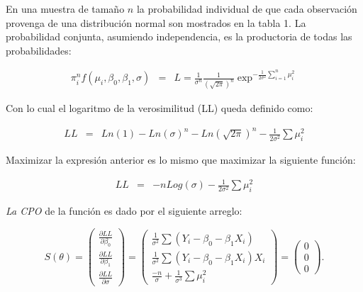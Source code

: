 \begin{frame}
	En una muestra de tamaño $n$ la probabilidad individual de que
	cada observación provenga de una distribución normal son mostrados
	en la tabla 1. La probabilidad conjunta, asumiendo independencia,
	es la productoria de todas las probabilidades:
	
	\begin{eqnarray}
		\pi_i^n f(\mu_i,\beta_0,\beta_1,\sigma) &=&L=
		\frac{1}{\sigma^n}\frac{1}{(\sqrt{2\pi})^n}\exp^{-\frac{1}{2\sigma^2}\sum_{i=1}^n\mu_i^2}
	\end{eqnarray}
	
	Con lo cual el logaritmo de la verosimilitud (LL) queda definido
	como:
	
	\begin{eqnarray*}
		LL &=&
		Ln(1)-Ln(\sigma)^n-Ln(\sqrt{2\pi})^n-\frac{1}{2\sigma^2}\sum\mu_i^2
	\end{eqnarray*}
	
	Maximizar la expresión anterior es lo mismo que maximizar la
	siguiente función:
	
	\begin{eqnarray}
		LL &=&-n Log(\sigma)-\frac{1}{2\sigma^2}\sum\mu_i^2
	\end{eqnarray}
\end{frame}

\begin{frame}
	\emph{La CPO} de la función es dado por el siguiente arreglo:
	
	\[ S(\theta) = \left( \begin{array}{cc}
		\frac{\partial LL}{\partial \beta_0}  \\
		\frac{\partial LL}{\partial \beta_1}  \\
		\frac{\partial LL}{\partial \sigma} \end{array} \right)=\left( \begin{array}{cc}
		\frac{1}{\sigma^2}\sum(Y_i-\beta_0-\beta_1 X_i)  \\
		\frac{1}{\sigma^2}\sum(Y_i-\beta_0-\beta_1 X_i)X_i  \\
		\frac{-n}{\sigma}+\frac{1}{\sigma^3}\sum\mu_i^2 \end{array} \right)=\left( \begin{array}{cc}
		0  \\
		0  \\
		0 \end{array} \right).\]
\end{frame}

